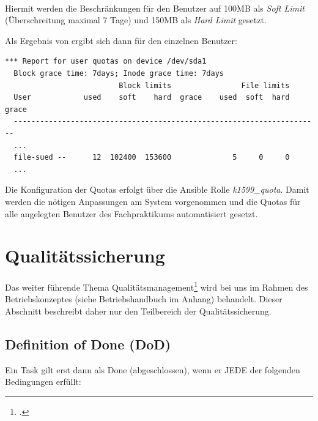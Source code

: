 \\

Hiermit werden die Beschränkungen für den Benutzer  auf 100MB
als \textit{Soft Limit} (Überschreitung maximal 7 Tage) und 150MB als
\textit{Hard Limit} gesetzt.

Als Ergebnis von ergibt sich dann für den einzelnen Benutzer:\\

\begin{lstlisting}[label=code:quota2,caption=repquota]
  *** Report for user quotas on device /dev/sda1
  Block grace time: 7days; Inode grace time: 7days
                          Block limits                File limits
  User            used    soft    hard  grace    used  soft  hard  grace
  ----------------------------------------------------------------------
  ...
  file-sued --      12  102400  153600              5     0     0
  ...
\end{lstlisting}

Die Konfiguration der Quotas erfolgt über die Ansible Rolle
\textit{k1599\_quota}. Damit werden die nötigen Anpassungen am System
vorgenommen und die Quotas für alle angelegten Benutzer des Fachpraktikums
automatisiert gesetzt.


\section{Qualitätssicherung}
\label{sec:qs}
Das weiter führende Thema Qualitätsmanagement\footcite{wikiQualityM} wird bei uns im Rahmen des Betriebskonzeptes (siehe Betriebshandbuch im Anhang) behandelt. Dieser Abschnitt beschreibt daher nur den Teilbereich der Qualitätssicherung.

\subsection{Definition of Done (DoD)}
\label{subsec:dod}
Ein Task gilt erst dann als Done (abgeschlossen), wenn er JEDE der folgenden Bedingungen erfüllt:

